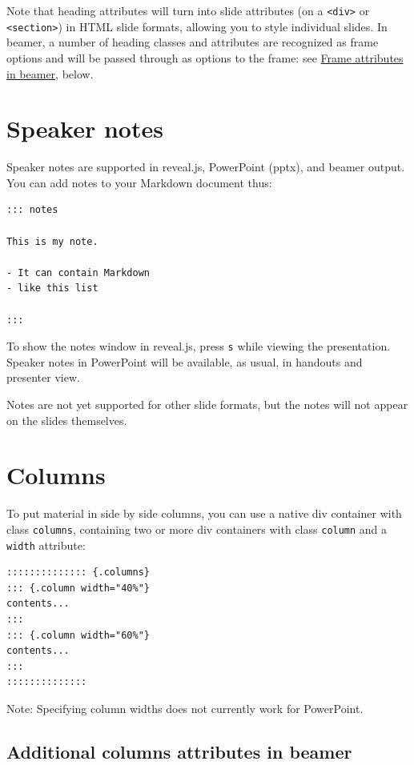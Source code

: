\documentclass[
  b5paper
]{book}
\begin{document}
Note that heading attributes will turn into slide attributes (on a
\texttt{\textless{}div\textgreater{}} or
\texttt{\textless{}section\textgreater{}}) in HTML slide formats,
allowing you to style individual slides. In beamer, a number of heading
classes and attributes are recognized as frame options and will be
passed through as options to the frame: see
\hyperref[frame-attributes-in-beamer]{Frame attributes in beamer},
below.

\section{Speaker notes}\label{speaker-notes}

Speaker notes are supported in reveal.js, PowerPoint (pptx), and beamer
output. You can add notes to your Markdown document thus:

\begin{verbatim}
::: notes

This is my note.

- It can contain Markdown
- like this list

:::
\end{verbatim}

To show the notes window in reveal.js, press \texttt{s} while viewing
the presentation. Speaker notes in PowerPoint will be available, as
usual, in handouts and presenter view.

Notes are not yet supported for other slide formats, but the notes will
not appear on the slides themselves.

\section{Columns}\label{columns}

To put material in side by side columns, you can use a native div
container with class \texttt{columns}, containing two or more div
containers with class \texttt{column} and a \texttt{width} attribute:

\begin{verbatim}
:::::::::::::: {.columns}
::: {.column width="40%"}
contents...
:::
::: {.column width="60%"}
contents...
:::
::::::::::::::
\end{verbatim}

Note: Specifying column widths does not currently work for PowerPoint.

\subsection{Additional columns attributes in
beamer}\label{additional-columns-attributes-in-beamer}
\end{document}
